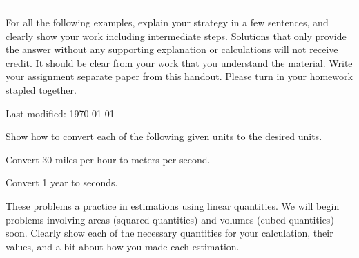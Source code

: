\documentclass{article}
\begin{document}
\hrule
\vspace{10pt}

For all the following examples, explain your strategy in a few
sentences, and clearly show your work including intermediate steps.
Solutions that only provide the answer without any supporting
explanation or calculations will not receive credit.  It should be clear
from your work that you understand the material.  Write your assignment
separate paper from this handout.  Please turn in your homework stapled
together.

{\tiny Last modified: \today}


Show how to convert each of the following given units to the desired
units.

\subproblem
Convert 30 miles per hour to meters per second.


\subproblem
Convert 1 year to seconds.



These problems a practice in estimations using linear quantities.  We
will begin problems involving areas (squared quantities) and volumes
(cubed quantities) soon.  Clearly show each of the necessary quantities
for your calculation, their values, and a bit about how you made each
estimation.




\end{document}
